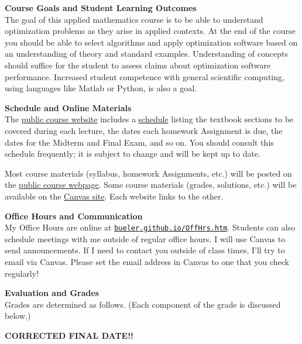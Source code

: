 \documentclass[12pt]{article}
\renewcommand{\emph}[1]{\textsf{\textbf{#1}}}
\newcommand{\localhead}[1]{\par\smallskip\textbf{#1} \smallskip\nobreak\\}%
\def\heading#1{\localhead{\large\emph{#1}}}
\begin{document}
\heading{Course Goals and Student Learning Outcomes}
The goal of this applied mathematics course is to be able to understand optimization problems as they arise in applied contexts.  At the end of the course you should be able to select algorithms and apply optimization software based on an understanding of theory and standard examples.  Understanding of concepts should suffice for the student to assess claims about optimization software performance.  Increased student competence with general scientific computing, using languages like Matlab or Python, is also a goal.


\heading{Schedule and Online Materials}
The \href{https://bueler.github.io/opt/}{public course website} includes a \href{https://bueler.github.io/opt/assets/general/schedule.pdf}{schedule} listing the textbook sections to be covered during each lecture, the dates each homework Assignment is due, the dates for the Midterm and Final Exam, and so on.  You should consult this schedule frequently; it is subject to change and will be kept up to date.

Most course materials (syllabus, homework Assignments, etc.) will be posted on the \href{https://bueler.github.io/opt/}{public course webpage}.  Some course materials (grades, solutions, etc.) will be available on the \href{https://canvas.alaska.edu/courses/9948}{Canvas site}.  Each website links to the other.


\heading{Office Hours and Communication}
My Office Hours are online at \href{http://bueler.github.io/OffHrs.htm}{\texttt{bueler.github.io/OffHrs.htm}}.  Students can also schedule meetings with me outside of regular office hours.  I will use Canvas to send announcements.  If I need to contact you outside of class times, I'll try to email via Canvas.  Please set the email address in Canvas to one that you check regularly!


\heading{Evaluation and Grades}
Grades are determined as follows.  (Each component of the grade is discussed below.)

\noindent \emph{CORRECTED FINAL DATE!!}
\end{document}
